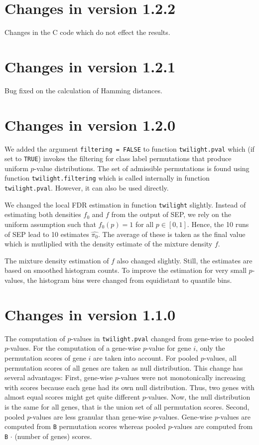 \documentclass[11pt,a4paper,fleqn]{report}
\newcommand{\Rfunction}[1]{{\texttt{#1}}}
\newcommand{\Rfunarg}[1]{{\texttt{#1}}}
\begin{document}
\section{Changes in version 1.2.2}

Changes in the C code which do not effect the results.


\section{Changes in version 1.2.1}

Bug fixed on the calculation of Hamming distances.


\section{Changes in version 1.2.0}

We added the argument \Rfunarg{filtering = FALSE} to function \Rfunction{twilight.pval} which (if set to \Rfunarg{TRUE}) invokes the filtering for class label permutations that produce uniform $p$-value distributions. The set of admissible permutations is found using function \Rfunarg{twilight.filtering} which is called internally in function \Rfunarg{twilight.pval}. However, it can also be used directly.

We changed the local FDR estimation in function \Rfunction{twilight} slightly. Instead of estimating both densities $f_0$ and $f$ from the output of SEP, we rely on the uniform assumption such that $f_0(p)=1$ for all $p \in [0,1]$. Hence, the 10 runs of SEP lead to 10 estimates $\widehat{\pi_0}$. The average of these is taken as the final value which is mutliplied with the density estimate of the mixture density $f$.

The mixture density estimation of $f$ also changed slightly. Still, the estimates are based on smoothed histogram counts. To improve the estimation for very small $p$-values, the histogram bins were changed from equidistant to quantile bins.
       
       
\section{Changes in version 1.1.0}

The computation of $p$-values in \Rfunction{twilight.pval} changed from gene-wise to pooled $p$-values. For the computation of a gene-wise $p$-value for gene $i$, only the permutation scores of gene $i$ are taken into account. For pooled $p$-values, all permutation scores of all genes are taken as null distribution. This change has several advantages: First, gene-wise $p$-values were not monotonically increasing with scores because each gene had its own null distribution. Thus, two genes with almost equal scores might get quite different $p$-values. Now, the null distribution is the same for all genes, that is the union set of all permutation scores. Second, pooled $p$-values are less granular than gene-wise $p$-values. Gene-wise $p$-values are computed from \Rfunarg{B} permutation scores whereas pooled $p$-values are computed from \Rfunarg{B} $\cdot$ (number of genes) scores.
\end{document}
